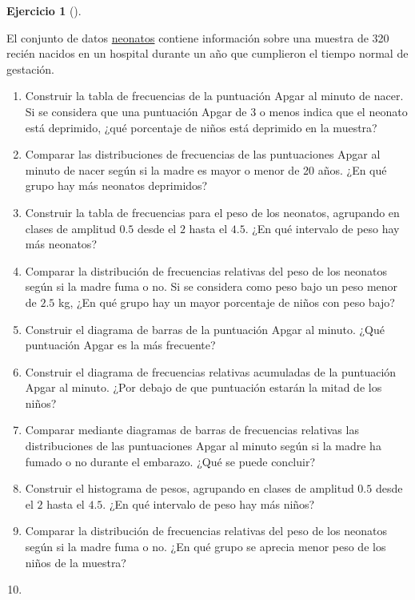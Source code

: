 \documentclass[
  a4paper,
]{scrreport}
\theoremstyle{definition}
\newtheorem{exercise}{Ejercicio}[chapter]
\theoremstyle{remark}
\begin{document}
\begin{exercise}[]\protect\hypertarget{exr-frecuencias-graficos-5}{}\label{exr-frecuencias-graficos-5}

El conjunto de datos \href{datos/neonatos.csv}{neonatos} contiene
información sobre una muestra de 320 recién nacidos en un hospital
durante un año que cumplieron el tiempo normal de gestación.

\begin{enumerate}
\def\labelenumi{\alph{enumi}.}
\item
  Construir la tabla de frecuencias de la puntuación Apgar al minuto de
  nacer. Si se considera que una puntuación Apgar de 3 o menos indica
  que el neonato está deprimido, ¿qué porcentaje de niños está deprimido
  en la muestra?
\item
  Comparar las distribuciones de frecuencias de las puntuaciones Apgar
  al minuto de nacer según si la madre es mayor o menor de 20 años. ¿En
  qué grupo hay más neonatos deprimidos?
\item
  Construir la tabla de frecuencias para el peso de los neonatos,
  agrupando en clases de amplitud \(0.5\) desde el \(2\) hasta el
  \(4.5\). ¿En qué intervalo de peso hay más neonatos?
\item
  Comparar la distribución de frecuencias relativas del peso de los
  neonatos según si la madre fuma o no. Si se considera como peso bajo
  un peso menor de \(2.5\) kg, ¿En qué grupo hay un mayor porcentaje de
  niños con peso bajo?
\item
  Construir el diagrama de barras de la puntuación Apgar al minuto. ¿Qué
  puntuación Apgar es la más frecuente?
\item
  Construir el diagrama de frecuencias relativas acumuladas de la
  puntuación Apgar al minuto. ¿Por debajo de que puntuación estarán la
  mitad de los niños?
\item
  Comparar mediante diagramas de barras de frecuencias relativas las
  distribuciones de las puntuaciones Apgar al minuto según si la madre
  ha fumado o no durante el embarazo. ¿Qué se puede concluir?
\item
  Construir el histograma de pesos, agrupando en clases de amplitud
  \(0.5\) desde el \(2\) hasta el \(4.5\). ¿En qué intervalo de peso hay
  más niños?
\item
  Comparar la distribución de frecuencias relativas del peso de los
  neonatos según si la madre fuma o no. ¿En qué grupo se aprecia menor
  peso de los niños de la muestra?
\item

\end{enumerate}
\end{exercise}
\end{document}
